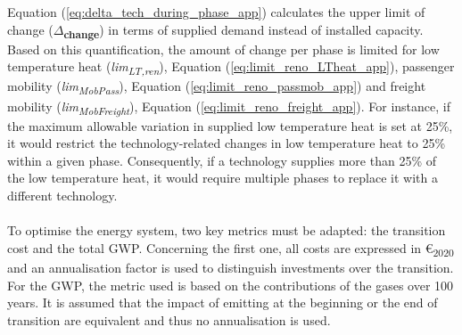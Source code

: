 Equation (\ref{eq:delta_tech_during_phase_app}) calculates the upper limit of change (\textbf{$\Delta$\textsubscript{change}}) in terms of supplied demand instead of installed capacity. 
Based on this quantification, the amount of change per phase is limited for low temperature heat (\emph{lim\textsubscript{LT,ren}}), Equation (\ref{eq:limit_reno_LTheat_app}), passenger mobility (\emph{lim\textsubscript{MobPass}}), Equation (\ref{eq:limit_reno_passmob_app}) and freight mobility (\emph{lim\textsubscript{MobFreight}}), Equation (\ref{eq:limit_reno_freight_app}). 
For instance, if the maximum allowable variation in supplied low temperature heat is set at 25\%, it would restrict the technology-related changes in low temperature heat to 25\% within a given phase. Consequently, if a technology supplies more than 25\% of the low temperature heat, it would require multiple phases to replace it with a different technology.\\


\\

\noindent
To optimise the energy system, two key metrics must be adapted: the transition cost and the total \acrfull{GWP}. 
Concerning the first one, all costs are expressed in €\textsubscript{2020} and an annualisation factor is used to distinguish investments over the transition. For the \gls{GWP}, the metric used is based on the contributions of the gases over 100 years. It is assumed that the impact of emitting at the beginning or the end of transition are equivalent and thus no annualisation is used. 


